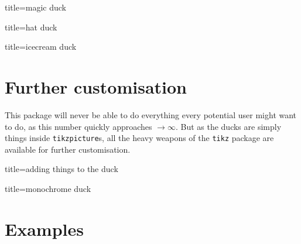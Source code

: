 \documentclass{ltxdockit}
\begin{document}
\begin{tcblisting}{title={magic duck}}
\begin{tikzpicture}
	\duck[magichat=teal,
				magicstars=blue!30!cyan,
				magicwand]
\end{tikzpicture}
\end{tcblisting}

\begin{tcblisting}{title={hat duck}}
\begin{tikzpicture}
	\duck[cricket=red!50!black]
\end{tikzpicture}
\end{tcblisting}

\begin{tcblisting}{title={icecream duck}}
\begin{tikzpicture}
	\duck[icecream]
\end{tikzpicture}
\begin{tikzpicture}
	\duck[icecream=brown, flavoura=brown, flavourb=white, flavourc=red]
\end{tikzpicture}
\end{tcblisting}

\section{Further customisation}

This package will never be able to do everything every potential user might want to do, as this number quickly approaches $\rightarrow \infty$. But as the ducks are simply things inside \texttt{tikzpicture}s, all the heavy weapons of the \texttt{tikz} package are available for further customisation.

\begin{tcblisting}{title={adding things to the duck}}
\end{tcblisting}


\begin{tcblisting}{title={monochrome duck}}
\end{tcblisting}

\section{Examples}
\end{document}
